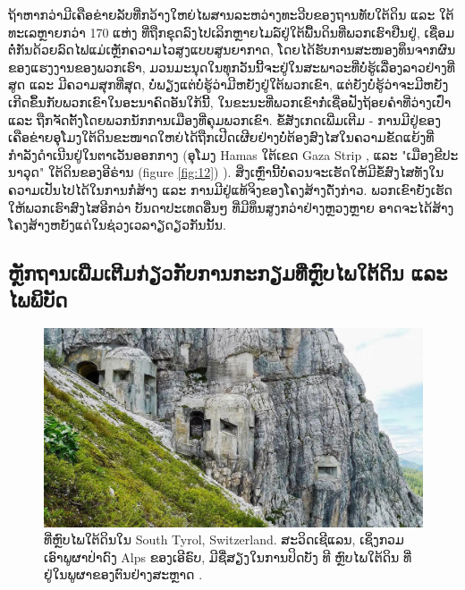 \documentclass[10pt,twocolumn,letterpaper]{article}
\begin{document}
ຖ້າຫາກວ່າມີເຄືອຂ່າຍລັບທີ່ກວ້າງໃຫຍ່ໄພສານລະຫວ່າງທະວີບຂອງຖານທັບໃຕ້ດິນ ແລະ ໃຕ້ທະເລຫຼາຍກວ່າ 170 ແຫ່ງ ທີ່ຖືກຂຸດລົງໄປເລິກຫຼາຍໄມລ໌ຢູ່ໃຕ້ພື້ນດິນທີ່ພວກເຮົາຢືນຢູ່, ເຊື່ອມຕໍ່ກັນດ້ວຍລົດໄຟແມ່ເຫຼັກຄວາມໄວສູງແບບສູນຍາກາດ, ໂດຍໄດ້ຮັບການສະໜອງທຶນຈາກຜົນຂອງແຮງງານຂອງພວກເຮົາ, ມວນມະນຸດໃນທຸກວັນນີ້ຈະຢູ່ໃນສະພາວະທີ່ບໍ່ຮູ້ເລື່ອງລາວຢ່າງທີ່ສູດ ແລະ ມີຄວາມສຸກທີ່ສຸດ, ບໍ່ພຽງແຕ່ບໍ່ຮູ້ວ່າມີຫຍັງຢູ່ໃຕ້ພວກເຂົາ, ແຕ່ຍັງບໍ່ຮູ້ວ່າຈະມີຫຍັງເກີດຂຶ້ນກັບພວກເຂົາໃນອະນາຄົດອັນໃກ້ນີ້, ໃນຂະນະທີ່ພວກເຂົາກໍ່ເຊື່ອຟັງຖ້ອຍຄຳທີ່ວ່າງເປົ່າ ແລະ ຖືກຈັດຕັ້ງໂດຍພວກນັກການເມືອງທີ່ຄຸມພວກເຂົາ.
ຂໍ້ສັງເກດເພີ່ມເຕີມ - ການມີຢູ່ຂອງເຄືອຂ່າຍອຸໂມງໃຕ້ດິນຂະໜາດໃຫຍ່ໄດ້ຖືກເປີດເຜີຍຢ່າງບໍ່ຕ້ອງສົງໄສໃນຄວາມຂັດແຍ້ງທີ່ກຳລັງດຳເນີນຢູ່ໃນຕາເວັນອອກກາງ (ອຸໂມງ Hamas ໃຕ້ເຂດ Gaza Strip \cite{38}, ແລະ "ເມືອງຂີປະນາວຸດ" ໃຕ້ດິນຂອງອີຣ່ານ
 (figure \ref{fig:12}) \cite{39,40}).  
ສິ່ງເຫຼົ່ານີ້ບໍ່ຄວນຈະເຮັດໃຫ້ມີຂໍ້ສົງໄສທັງໃນຄວາມເປັນໄປໄດ້ໃນການກໍ່ສ້າງ ແລະ ການມີຢູ່ແທ້ຈິງຂອງໂຄງສ້າງດັ່ງກ່າວ. 
ພວກເຂົາຍັງເຮັດໃຫ້ພວກເຮົາສົງໄສອີກວ່າ ບັນດາປະເທດອື່ນໆ ທີ່ມີທຶນສູງກວ່າຢ່າງຫຼວງຫຼາຍ ອາດຈະໄດ້ສ້າງໂຄງສ້າງຫຍັງແດ່ໃນຊ່ວງເວລາຽດຽວກັນນັ້ນ.
\subsection{ຫຼັກຖານເພີ່ມເຕີມກ່ຽວກັບການກະກຽມທີ່ຫຼົບໄພໃຕ້ດິນ ແລະ ໄພພິບັດ}

\begin{figure}[t]
\begin{center}
   \includegraphics[width=1\linewidth]{tyrol.jpg}
\end{center}
   \caption{ທີ່ຫຼົບໄພໃຕ້ດິນໃນ South Tyrol, Switzerland.
ສະວິດເຊີແລນ, ເຊິ່ງກວມເອົາພູຜາປ່າດົງ Alps ຂອງເອີຣົບ, ມີຊື່ສຽງໃນການປິດບັງ ທີ ຫຼົບໄພໃຕ້ດິນ ທີ່ຢູ່ໃນພູຜາຂອງຕົນຢ່າງສະຫຼາດ \cite{32}.}
\label{fig:7}
\label{fig:onecol}
\end{figure}
\end{document}
